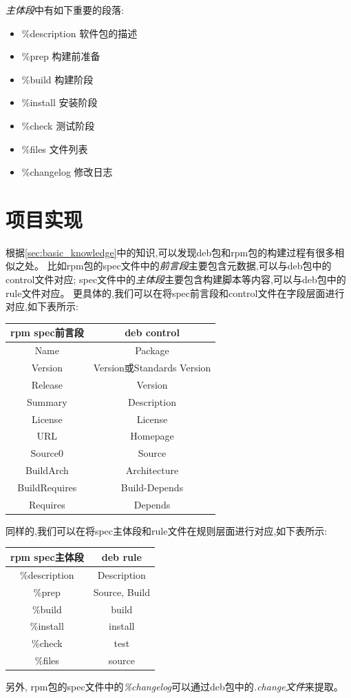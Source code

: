 \documentclass{article}
\begin{document}
\emph{主体段}中有如下重要的段落:
\begin{itemize}
    \item \%description  软件包的描述
    \item \%prep  构建前准备
    \item \%build  构建阶段
    \item \%install  安装阶段
    \item \%check  测试阶段
    \item \%files  文件列表
    \item \%changelog  修改日志
\end{itemize}

\section{项目实现}
根据\ref{sec:basic_knowledge}中的知识,可以发现deb包和rpm包的构建过程有很多相似之处。
比如rpm包的spec文件中的\emph{前言段}主要包含元数据,可以与deb包中的control文件对应;
spec文件中的\emph{主体段}主要包含构建脚本等内容,可以与deb包中的rule文件对应。
更具体的,我们可以在将spec前言段和control文件在字段层面进行对应,如下表所示:
\begin{center}
    \begin{tabular}{|c|c|}
    \hline
    rpm spec前言段 & deb control\\
    \hline
    Name & Package \\
    \hline
    Version & Version或Standards Version \\
    \hline
    Release & Version \\
    \hline
    Summary & Description \\
    \hline
    License & License \\
    \hline
    URL & Homepage \\
    \hline
    Source0 & Source \\
    \hline
    BuildArch & Architecture \\
    \hline
    BuildRequires & Build-Depends \\
    \hline
    Requires & Depends \\
    \hline
    \end{tabular}
\end{center}

同样的,我们可以在将spec主体段和rule文件在规则层面进行对应,如下表所示:
\begin{center}
    \begin{tabular}{|c|c|}
        \hline
        rpm spec主体段 & deb rule \\
        \hline
        \%description & Description \\
        \hline
        \%prep & Source, Build \\
        \hline
        \%build & build \\
        \hline
        \%install & install \\
        \hline
        \%check & test \\
        \hline
        \%files & source \\
        \hline
    \end{tabular}
\end{center}
另外, rpm包的spec文件中的\emph{\%changelog}可以通过deb包中的\emph{.change文件}来提取。
\end{document}
